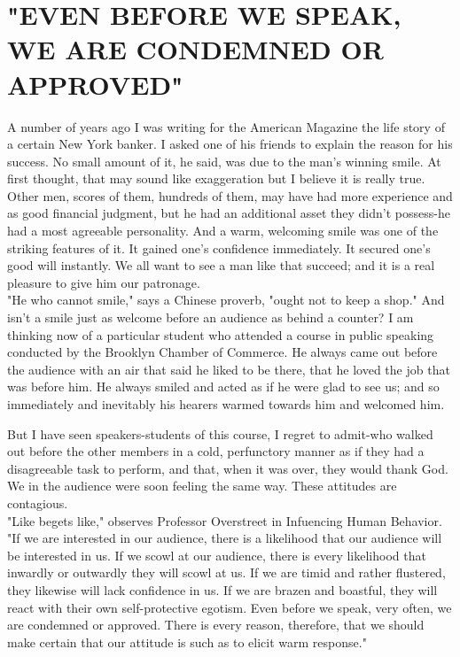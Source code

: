 \documentclass[10pt]{article}
\begin{document}
\section*{"EVEN BEFORE WE SPEAK, WE ARE CONDEMNED OR APPROVED"}
A number of years ago I was writing for the American Magazine the life story of a certain New York banker. I asked one of his friends to explain the reason for his success. No small amount of it, he said, was due to the man's winning smile. At first thought, that may sound like exaggeration but I believe it is really true. Other men, scores of them, hundreds of them, may have had more experience and as good financial judgment, but he had an additional asset they didn't possess-he had a most agreeable personality. And a warm, welcoming smile was one of the striking features of it. It gained one's confidence immediately. It secured one's good will instantly. We all want to see a man like that succeed; and it is a real pleasure to give him our patronage.\\
"He who cannot smile," says a Chinese proverb, "ought not to keep a shop." And isn't a smile just as welcome before an audience as behind a counter? I am thinking now of a particular student who attended a course in public speaking conducted by the Brooklyn Chamber of Commerce. He always came out before the audience with an air that said he liked to be there, that he loved the job that was before him. He always smiled and acted as if he were glad to see us; and so immediately and inevitably his hearers warmed towards him and welcomed him.

But I have seen speakers-students of this course, I regret to admit-who walked out before the other members in a cold, perfunctory manner as if they had a disagreeable task to perform, and that, when it was over, they would thank God. We in the audience were soon feeling the same way. These attitudes are contagious.\\
"Like begets like," observes Professor Overstreet in Infuencing Human Behavior. "If we are interested in our audience, there is a likelihood that our audience will be interested in us. If we scowl at our audience, there is every likelihood that inwardly or outwardly they will scowl at us. If we are timid and rather flustered, they likewise will lack confidence in us. If we are brazen and boastful, they will react with their own self-protective egotism. Even before we speak, very often, we are condemned or approved. There is every reason, therefore, that we should make certain that our attitude is such as to elicit warm response."
\end{document}
